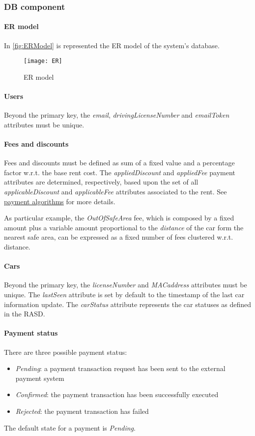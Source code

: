 \subsubsection{DB component}
\paragraph{ER model}In \autoref{fig:ERModel} is represented the ER model of the system's database.

\begin{figure}[h!]
	\centering
	\texttt{[image: ER]}
	\caption{
		\label{fig:ERModel} 
		ER model
	}
\end{figure}

\paragraph{Users} Beyond the primary key, the \mbox{\emph{email}}, \mbox{\emph{drivingLicenseNumber}} and \mbox{\emph{emailToken}} attributes must be unique.

\paragraph{Fees and discounts}
Fees and discounts must be defined as sum of a fixed value and a percentage factor w.r.t. the base rent cost.
The \emph{appliedDiscount} and \emph{appliedFee} payment attributes are determined, respectively, based upon the set of all \emph{applicableDiscount} and \emph{applicableFee} attributes associated to the rent. See \hyperref[sec:paymentAlgorithms]{payment algorithms} for more details.

As particular example, the \emph{OutOfSafeArea} fee, which is composed by a fixed amount plus a variable amount proportional to the \emph{distance} of the car form the nearest safe area, can be expressed as a fixed number of fees clustered w.r.t. distance.

\paragraph{Cars}Beyond the primary key, the \mbox{\emph{licenseNumber}} and \emph{MACaddress} attributes must be unique. The \mbox{\emph{lastSeen}} attribute is set by default to the timestamp of the last car information update. The \mbox{\emph{carStatus}} attribute represents the car statuses as defined in the RASD.

\paragraph{Payment status} There are three possible payment status:
\begin{itemize}
	\item \emph{Pending}: a payment transaction request has been sent to the external payment system
	\item \emph{Confirmed}: the payment transaction has been successfully executed
	\item \emph{Rejected}: the payment transaction has failed
\end{itemize}
The default state for a payment is \emph{Pending}.

